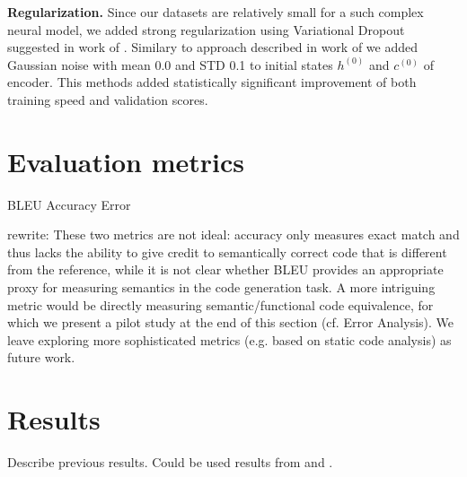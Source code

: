 \textbf{Regularization.} Since our datasets are relatively small for  a such complex neural model, we added strong regularization using Variational Dropout suggested in work of \cite{Gal2016}. Similary to approach described in work of \cite{zimmermann2012} we added Gaussian noise with mean 0.0 and STD 0.1 to initial states $h^{(0)}$ and $c^{(0)}$ of encoder. This methods added statistically significant improvement of both training speed and validation scores.

\section{Evaluation metrics}
BLEU
Accuracy
Error

rewrite: These two metrics are not ideal: accuracy only measures exact match and thus lacks the ability to give credit to semantically correct code that is different from the reference, while it is not clear whether BLEU provides an appropriate proxy for measuring semantics in the code generation task. A more
intriguing metric would be directly measuring semantic/functional code equivalence, for which we present a pilot study
at the end of this section (cf. Error Analysis). We leave exploring more sophisticated metrics (e.g. based on static code
analysis) as future work.

\section{Results}

Describe previous results. Could be used results from \cite{Yin2017} and \cite{Barone2017}.


